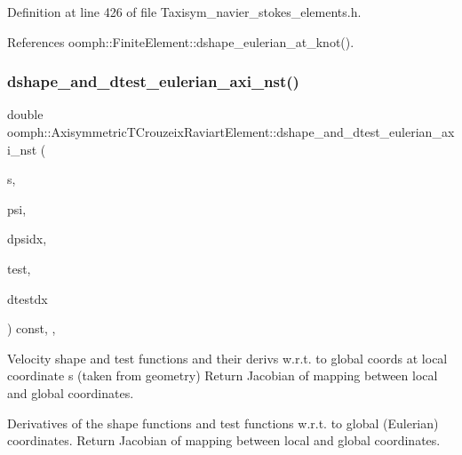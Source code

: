 Definition at line 426 of file Taxisym\+\_\+navier\+\_\+stokes\+\_\+elements.\+h.



References oomph\+::\+Finite\+Element\+::dshape\+\_\+eulerian\+\_\+at\+\_\+knot().

\mbox{\label{classoomph_1_1AxisymmetricTCrouzeixRaviartElement_a0ee2d8653afb290ec3215e976f34830d}} 
\subsubsection{\texorpdfstring{dshape\+\_\+and\+\_\+dtest\+\_\+eulerian\+\_\+axi\+\_\+nst()}{dshape\_and\_dtest\_eulerian\_axi\_nst()}}
{\footnotesize\ttfamily double oomph\+::\+Axisymmetric\+T\+Crouzeix\+Raviart\+Element\+::dshape\+\_\+and\+\_\+dtest\+\_\+eulerian\+\_\+axi\+\_\+nst (\begin{DoxyParamCaption}\item[{const \hyperlink{classoomph_1_1Vector}{Vector}$<$ double $>$ \&}]{s,  }\item[{\hyperlink{classoomph_1_1Shape}{Shape} \&}]{psi,  }\item[{\hyperlink{classoomph_1_1DShape}{D\+Shape} \&}]{dpsidx,  }\item[{\hyperlink{classoomph_1_1Shape}{Shape} \&}]{test,  }\item[{\hyperlink{classoomph_1_1DShape}{D\+Shape} \&}]{dtestdx }\end{DoxyParamCaption}) const\hspace{0.3cm}{\ttfamily [inline]}, {\ttfamily [protected]}, {\ttfamily [virtual]}}



Velocity shape and test functions and their derivs w.\+r.\+t. to global coords at local coordinate s (taken from geometry) Return Jacobian of mapping between local and global coordinates. 

Derivatives of the shape functions and test functions w.\+r.\+t. to global (Eulerian) coordinates. Return Jacobian of mapping between local and global coordinates. 

